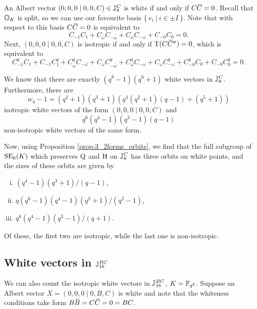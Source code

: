 An Albert vector $(0,0,0\mid 0,0,C) \in \mathbb{J}_8^C$ is white if and only if $C\mathord{\mbox{\hspace*{0pt}}\,\overline{\!C\!\!\;}\!\:}\mbox{\hspace*{0pt}} = 0$. Recall that
$\mathbb{O}_K$ is split, so we can use our favourite basis $\{\ e_i\ \big|\ i \in \pm I\ \}$. Note that
with respect to this basis $C\mathord{\mbox{\hspace*{0pt}}\,\overline{\!C\!\!\;}\!\:}\mbox{\hspace*{0pt}} = 0$ is equivalent to 
\begin{equation}
	C_{-1}C_{1} + C_{\bar{\omega}} C_{-\bar{\omega}} + C_{\omega} C_{-\omega} + C_{-0} C_{0} = 0.
\end{equation}
Next, $(0,0,0\mid 0,0,C)$ is isotropic if and only if $\operatorname{T}(C \mathord{\mbox{\hspace*{0pt}}\,\overline{\!C\!\!\;}\!\:}\mbox{\hspace*{0pt}}^{\sigma}) = 0$, which is equivalent
to
\begin{equation}
	C_{-1}^qC_{1} + C_{-1}C_{1}^q + 
	C_{\bar{\omega}}^q C_{-\bar{\omega}} + C_{\bar{\omega}} C_{-\bar{\omega}}^q + 
	C_{\omega}^q C_{-\omega} + C_{\omega} C_{-\omega}^q + 
	C_{-0}^q C_{0} + C_{-0} C_{0}^q = 0.
\end{equation}

We know that there are exactly $(q^8-1)(q^6+1)$ white vectors in $\mathbb{J}_8^C$. Furthermore,
there are
\begin{equation}
	w_4 - 1 = (q^2+1)(q^3+1)(q^3(q^2+1)(q-1)+(q^5+1))
\end{equation}
isotropic white vectors of the form $(0,0,0 \mid 0,0,C)$ and
\begin{equation}
q^6(q^4-1)(q^3-1)(q-1)
\end{equation}
non-isotropic white vectors of the same form.

Now, using Proposition \ref{prop:3_2forms_orbits}, we find that the full subgroup of 
$\mathrm{SE}_6(K)$ which preserves $\mathord{\mathrm{Q}}$ 
and
$\mathrm{H}$ on $\mathbb{J}_8^C$ has three orbits on white points, and the sizes of these orbits are given by
\begin{enumerate}[(i)]
	\item $(q^4-1)(q^3+1)/(q-1)$,
	\item $q(q^6-1)(q^4-1)(q^2+1)/(q^2-1)$,
	\item $q^6 (q^4-1)(q^3-1)/(q+1)$.
\end{enumerate}
Of these, the first two are isotropic, while the last one is non-isotropic. 

\subsection{White vectors in $\mathbb{J}_{16}^{BC}$}

We can also count the isotropic white vectors in $\mathbb{J}_{16}^{BC}$, $K = \mathbb{F}_{q^2}$. Suppose an Albert vector
\mbox{$X = (0,0,0\mid 0,B,C)$} is white and note that the whiteness conditions 
take form $B\ovB = C\ovC = 0 = BC$. 

